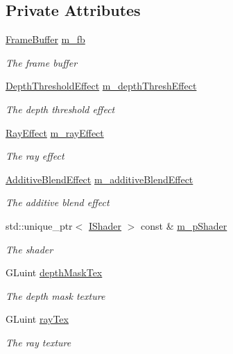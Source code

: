 \subsection*{Private Attributes}
\begin{DoxyCompactItemize}
\item 
\hyperlink{class_frame_buffer}{Frame\+Buffer} \hyperlink{class_god_rays_effect_af61e8ec64b9ab0aeaa9aa012c3b9a9fb}{m\+\_\+fb}
\begin{DoxyCompactList}\small\item\em The frame buffer \end{DoxyCompactList}\item 
\hyperlink{class_depth_threshold_effect}{Depth\+Threshold\+Effect} \hyperlink{class_god_rays_effect_a9b389cc1f467514e3d7c71128cbedc94}{m\+\_\+depth\+Thresh\+Effect}
\begin{DoxyCompactList}\small\item\em The depth threshold effect \end{DoxyCompactList}\item 
\hyperlink{class_ray_effect}{Ray\+Effect} \hyperlink{class_god_rays_effect_a1fd31b7f67687b9249fcd7a17b9dd2a5}{m\+\_\+ray\+Effect}
\begin{DoxyCompactList}\small\item\em The ray effect \end{DoxyCompactList}\item 
\hyperlink{class_additive_blend_effect}{Additive\+Blend\+Effect} \hyperlink{class_god_rays_effect_abbfb20b6a95e5d766b762ef274b52ff2}{m\+\_\+additive\+Blend\+Effect}
\begin{DoxyCompactList}\small\item\em The additive blend effect \end{DoxyCompactList}\item 
std\+::unique\+\_\+ptr$<$ \hyperlink{class_i_shader}{I\+Shader} $>$ const \& \hyperlink{class_god_rays_effect_a37e1e9a2264b18594ff6e6a3bbda3d5b}{m\+\_\+p\+Shader}
\begin{DoxyCompactList}\small\item\em The shader \end{DoxyCompactList}\item 
G\+Luint \hyperlink{class_god_rays_effect_a9fae676827f21555ac5b060909186ff0}{depth\+Mask\+Tex}
\begin{DoxyCompactList}\small\item\em The depth mask texture \end{DoxyCompactList}\item 
G\+Luint \hyperlink{class_god_rays_effect_a3b83f80557cf2e0b35f423970a379ffb}{ray\+Tex}
\begin{DoxyCompactList}\small\item\em The ray texture \end{DoxyCompactList}\end{DoxyCompactItemize}


